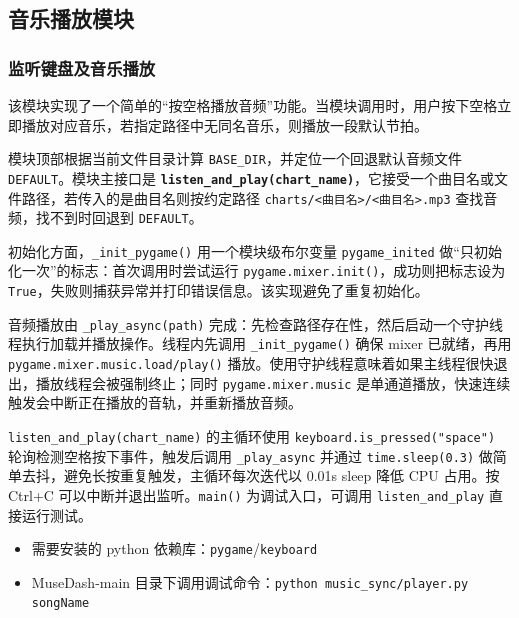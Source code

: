\documentclass[12pt, a4paper]{article}
\begin{document}
\subsection{音乐播放模块}

\subsubsection{监听键盘及音乐播放}

该模块实现了一个简单的“按空格播放音频”功能。当模块调用时，用户按下空格立即播放对应音乐，若指定路径中无同名音乐，则播放一段默认节拍。

模块顶部根据当前文件目录计算 \texttt{BASE\_DIR}，并定位一个回退默认音频文件 \texttt{DEFAULT}。模块主接口是 \textbf{\texttt{listen\_and\_play(chart\_name)}}，它接受一个曲目名或文件路径，若传入的是曲目名则按约定路径 \texttt{charts/<曲目名>/<曲目名>.mp3} 查找音频，找不到时回退到 \texttt{DEFAULT}。

初始化方面，\texttt{\_init\_pygame()} 用一个模块级布尔变量 \texttt{pygame\_inited} 做“只初始化一次”的标志：首次调用时尝试运行 \texttt{pygame.mixer.init()}，成功则把标志设为 \texttt{True}，失败则捕获异常并打印错误信息。该实现避免了重复初始化。

音频播放由 \texttt{\_play\_async(path)} 完成：先检查路径存在性，然后启动一个守护线程执行加载并播放操作。线程内先调用 \texttt{\_init\_pygame()} 确保 mixer 已就绪，再用 \texttt{pygame.mixer.music.load/play()} 播放。使用守护线程意味着如果主线程很快退出，播放线程会被强制终止；同时 \texttt{pygame.mixer.music} 是单通道播放，快速连续触发会中断正在播放的音轨，并重新播放音频。

\texttt{listen\_and\_play(chart\_name)} 的主循环使用 \texttt{keyboard.is\_pressed("space")} 轮询检测空格按下事件，触发后调用 \texttt{\_play\_async} 并通过 \texttt{time.sleep(0.3)} 做简单去抖，避免长按重复触发，主循环每次迭代以 0.01s sleep 降低 CPU 占用。按 Ctrl+C 可以中断并退出监听。\texttt{main()} 为调试入口，可调用 \texttt{listen\_and\_play} 直接运行测试。

\begin{itemize}
    \item 需要安装的 python 依赖库：\texttt{pygame}/\texttt{keyboard}
    \item MuseDash-main 目录下调用调试命令：\texttt{python music\_sync/player.py songName}
\end{itemize}
\end{document}
